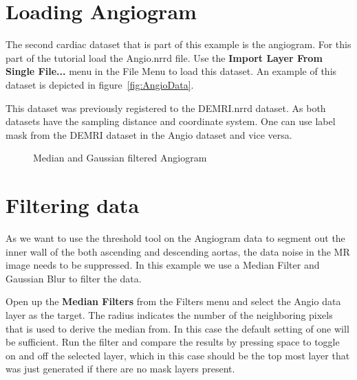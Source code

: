 \documentclass[fleqn,11pt,openany]{book}
\begin{document}
\section{Loading  Angiogram}

The second cardiac dataset that is part of this example is the angiogram. For this part of the tutorial load the Angio.nrrd file. Use the {\bf Import Layer From Single File...} menu in the File Menu to load this dataset. An example of this dataset is depicted in figure~\ref{fig:AngioData}.

This dataset was previously registered to the DEMRI.nrrd dataset. As both datasets have the sampling distance and coordinate system. One can use label mask from the DEMRI dataset in the Angio dataset and vice versa. 

\begin{figure}
\caption{Median and Gaussian filtered Angiogram}\label{fig:FilteredAngioData}
\end{figure}

\section{Filtering data}

As we want to use the threshold tool on the Angiogram data to segment out the inner wall of the both ascending and descending aortas, the data noise in the MR image needs to be suppressed. In this example we use a Median Filter and Gaussian Blur to filter the data.

Open up the {\bf Median Filters} from the Filters menu and select the Angio data layer as the target. The radius indicates the number of the neighboring pixels that is used to derive the median from. In this case the default setting of one will be sufficient. Run the filter and compare the results by pressing space to toggle on and off the selected layer, which in this case should be the top most layer that was just generated if there are no mask layers present.
\end{document}
